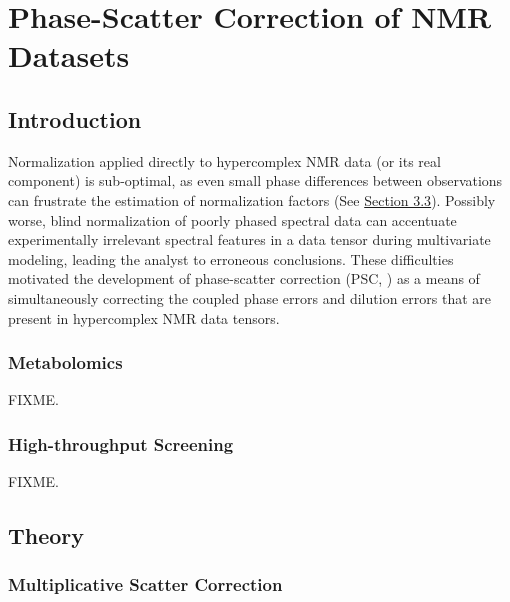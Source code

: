 
\chapter{Phase-Scatter Correction of NMR Datasets}

\section{Introduction}

\begin{doublespace}
Normalization applied directly to hypercomplex NMR data (or its real component)
is sub-optimal, as even small phase differences between observations can
frustrate the estimation of normalization factors
(See \hyperlink{section.3.3}{Section 3.3}). Possibly worse, blind
normalization of poorly phased spectral data can accentuate experimentally
irrelevant spectral features in a data tensor during multivariate modeling,
leading the analyst to erroneous conclusions. These difficulties motivated
the development of phase-scatter correction (PSC, \cite{worley:abio2013}) as
a means of simultaneously correcting the coupled phase errors and dilution
errors that are present in hypercomplex NMR data tensors.
\end{doublespace}

\subsection{Metabolomics}

\begin{doublespace}
FIXME.
\end{doublespace}

\subsection{High-throughput Screening}

\begin{doublespace}
FIXME.
\end{doublespace}

\section{Theory}

\subsection{Multiplicative Scatter Correction}

